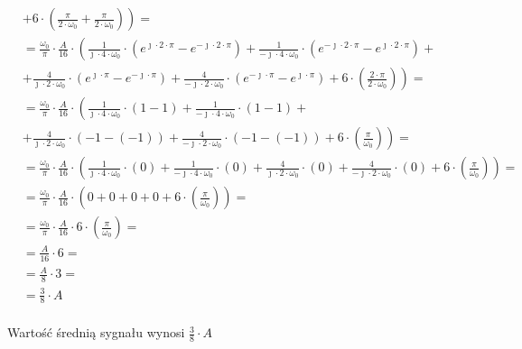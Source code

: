 \begin{task}
\begin{align*}
&+\left. 6 \cdot  \left( \frac{\pi}{2\cdot\omega_0} + \frac{\pi}{2\cdot\omega_0} \right)\right)=\\
&=\frac{\omega_0}{\pi} \cdot \frac{A}{16} \cdot \left(\frac{1}{\jmath \cdot 4 \cdot \omega_0} \cdot \left( e^{\jmath \cdot 2 \cdot \pi} - e^{-\jmath \cdot 2 \cdot \pi}\right) +\frac{1}{-\jmath \cdot 4 \cdot \omega_0}\cdot \left( e^{-\jmath \cdot 2 \cdot \pi} - e^{\jmath \cdot 2 \cdot \pi}\right)\right.+\\
&\left. +\frac{4}{\jmath \cdot 2 \cdot \omega_0}\cdot \left( e^{\jmath \cdot \pi} - e^{-\jmath \cdot \pi}\right) +\frac{4}{-\jmath \cdot 2 \cdot \omega_0} \cdot \left( e^{-\jmath \cdot \pi} - e^{\jmath \cdot \pi}\right) + 6 \cdot  \left( \frac{2 \cdot \pi}{2\cdot\omega_0} \right)\right)=\\
&=\frac{\omega_0}{\pi} \cdot \frac{A}{16} \cdot \left(\frac{1}{\jmath \cdot 4 \cdot \omega_0} \cdot \left( 1 - 1\right) +\frac{1}{-\jmath \cdot 4 \cdot \omega_0}\cdot \left( 1 - 1\right)\right.+\\
&\left. +\frac{4}{\jmath \cdot 2 \cdot \omega_0}\cdot \left( -1 - (-1)\right) +\frac{4}{-\jmath \cdot 2 \cdot \omega_0} \cdot \left(-1 - (-1)\right) + 6 \cdot  \left( \frac{\pi}{\omega_0} \right)\right)=\\
&=\frac{\omega_0}{\pi} \cdot \frac{A}{16} \cdot \left(\frac{1}{\jmath \cdot 4 \cdot \omega_0} \cdot \left( 0\right) +\frac{1}{-\jmath \cdot 4 \cdot \omega_0}\cdot \left( 0\right) +\frac{4}{\jmath \cdot 2 \cdot \omega_0}\cdot \left( 0\right) +\frac{4}{-\jmath \cdot 2 \cdot \omega_0} \cdot \left(0\right) + 6 \cdot  \left( \frac{\pi}{\omega_0} \right)\right)=\\
&=\frac{\omega_0}{\pi} \cdot \frac{A}{16} \cdot \left(0 +0 +0 +0 + 6 \cdot  \left( \frac{\pi}{\omega_0} \right)\right)=\\
&=\frac{\omega_0}{\pi} \cdot \frac{A}{16} \cdot 6 \cdot  \left( \frac{\pi}{\omega_0} \right)=\\
&= \frac{A}{16} \cdot 6=\\
&= \frac{A}{8} \cdot 3=\\
&= \frac{3}{8} \cdot A\\
\end{align*}

Wartość średnią sygnału wynosi $\frac{3}{8} \cdot A$
\end{task}